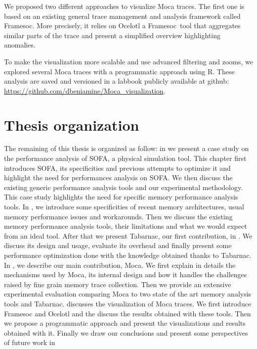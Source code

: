 We proposed two different approaches to visualize \gls{Moca} traces.
The first one is based on an existing general trace management and analysis framework called \gls{Framesoc}.
More precisely, it relies on \gls{Ocelotl} a \gls{Framesoc} tool that aggregates similar parts of the trace and present a simplified overview highlighting anomalies.

To make the visualization more scalable and use advanced filtering and zooms, we explored several \gls{Moca} traces with a programmatic approach using \gls{R}.
These analysis are saved and versioned in a labbook publicly available at github: \url{https://github.com/dbeniamine/Moca_visualization}.

\section{Thesis organization}

The remaining of this thesis is organized as follow:
in  we present a case study on the performance analysis of \gls{SOFA}, a physical simulation tool.
This chapter first introduces \gls{SOFA}, its specificities and previous attempts to optimize it and highlight the need for performances analysis on \gls{SOFA}.
We then discuss the existing generic performance analysis tools and our experimental methodology.
This case study highlights the need for specific memory performance analysis tools.
In , we introduce some specificities of recent memory architectures, usual memory performance issues and workarounds.
Then we discuss the existing memory performance analysis tools, their limitations and what we would expect from an ideal tool.
After that we present \gls{Tabarnac}, our first contribution, in .
We discuss its design and usage, evaluate its overhead and finally present some performance optimization done with the knowledge obtained thanks to \gls{Tabarnac}.
In , we describe our main contribution, \gls{Moca}.
We first explain in details the mechanisms used by \gls{Moca}, its internal design and how it handles the challenges raised by fine grain memory trace collection.
Then we provide an extensive experimental evaluation comparing \gls{Moca} to two state of the art memory analysis tools and \gls{Tabarnac}.
 discusses the visualization of \gls{Moca} traces.
We first introduce \gls{Framesoc} and \gls{Ocelotl} and the discuss the results obtained with these tools.
Then we propose a programmatic approach and present the visualizations and results obtained with it.
Finally we draw our conclusions and present some perspectives of future work in 
